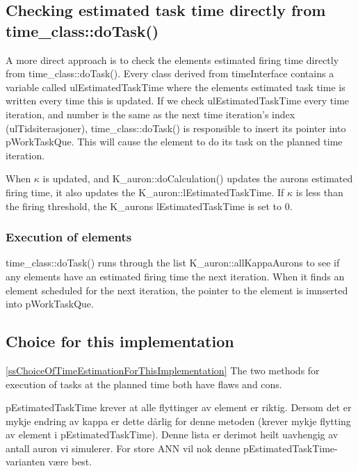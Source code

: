 	\subsection{Checking estimated task time directly from time\_class::doTask()}
	A more direct approach is to check the elements estimated firing time directly from time\_class::doTask(). 
	Every class derived from timeInterface contains a variable called ulEstimatedTaskTime where the elements estimated task time is written every time this is updated.
	If we check ulEstimatedTaskTime every time iteration, and number is the same as the next time iteration's index (ulTidsiterasjoner), time\_class::doTask() is responsible to insert its pointer into pWorkTaskQue.
	This will cause the element to do its task on the planned time iteration.

	When $\kappa$ is updated, and K\_auron::doCalculation() updates the aurons estimated firing time, it also updates the K\_auron::lEstimatedTaskTime.
	If $\kappa$ is less than the firing threshold, the K\_aurons lEstimatedTaskTime is set to 0. 

	\subsubsection{Execution of elements}
	time\_class::doTask() runs through the list K\_auron::allKappaAurons to see if any elements have an estimated firing time the next iteration.
	When it finds an element scheduled for the next iteration, the pointer to the element is imnserted into pWorkTaskQue.


	\subsection{Choice for this implementation}
	\ref{ssChoiceOfTimeEstimationForThisImplementation}
	The two methods for execution of tasks at the planned time both have flaws and cons.
	
	pEstimatedTaskTime krever at alle flyttinger av element er riktig. Dersom det er mykje endring av kappa er dette dårlig for denne metoden (krever mykje flytting av element i pEstimatedTaskTime).
	Denne lista er derimot heilt uavhengig av antall auron vi simulerer. For store ANN vil nok denne pEstimatedTaskTime-varianten være best.

